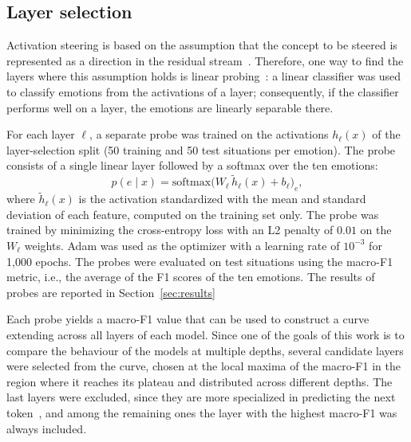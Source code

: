 \documentclass{article}
\begin{document}
\subsection{Layer selection}
\label{sec:methods_selection}
Activation steering is based on the assumption that the concept to be steered is represented as a direction in the residual stream~\cite{park2024linearrep, turner2024steeract, panickssery2024steerllama2}. Therefore, one way to find the layers where this assumption holds is linear probing~\cite{alain2018understanding}: a linear classifier was used to classify emotions from the activations of a layer; consequently, if the classifier performs well on a layer, the emotions are linearly separable there.

For each layer $\ell$, a separate probe was trained on the activations $h_\ell(x)$ of the layer-selection split (50 training and 50 test situations per emotion). The probe consists of a single linear layer followed by a softmax over the ten emotions:
\begin{equation}
p(e \mid x) = \mathrm{softmax}\big(W_\ell\, \tilde h_\ell(x) + b_\ell\big)_e ,
\end{equation}
where $\tilde h_\ell(x)$ is the activation standardized with the mean and standard deviation of each feature, computed on the training set only. The probe was trained by minimizing the cross-entropy loss with an L2 penalty of $0.01$ on the $W_\ell$ weights. Adam was used as the optimizer with a learning rate of $10^{-3}$ for 1{,}000 epochs. The probes were evaluated on test situations using the macro-F1 metric, i.e., the average of the F1 scores of the ten emotions. The results of probes are reported in Section~\ref{sec:results}

Each probe yields a macro-F1 value that can be used to construct a curve extending across all layers of each model. Since one of the goals of this work is to compare the behaviour of the models at multiple depths, several candidate layers were selected from the curve, chosen at the local maxima of the macro-F1 in the region where it reaches its plateau and distributed across different depths. The last layers were excluded, since they are more specialized in predicting the next token~\cite{lad2025remarkable}, and among the remaining ones the layer with the highest macro-F1 was always included.
\end{document}

